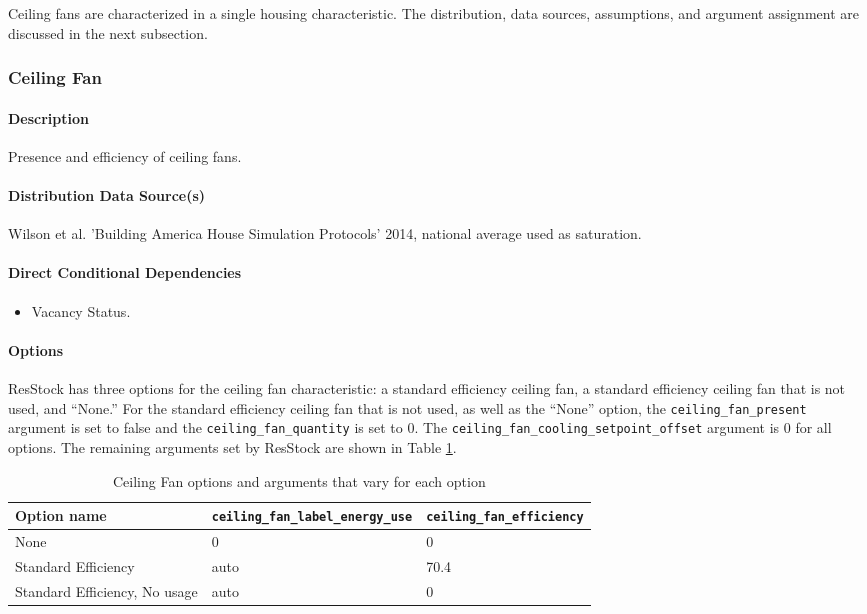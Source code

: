 Ceiling fans are characterized in a single housing characteristic. The distribution, data sources, assumptions, and argument assignment are discussed in the next subsection.

\subsubsection{Ceiling Fan}
\paragraph{Description}
Presence and efficiency of ceiling fans.

\paragraph{Distribution Data Source(s)}
Wilson et al. 'Building America House Simulation Protocols' 2014, national average used as saturation.

\paragraph{Direct Conditional Dependencies}
\begin{itemize}
    \item Vacancy Status.
\end{itemize}

\paragraph{Options}
ResStock has three options for the ceiling fan characteristic: a standard efficiency ceiling fan, a standard efficiency ceiling fan that is not used, and ``None.'' For the standard efficiency ceiling fan that is not used, as well as the ``None'' option, the \texttt{ceiling\_fan\_present} argument is set to false and the \texttt{ceiling\_fan\_quantity} is set to 0. The \texttt{ceiling\_fan\_cooling\_setpoint\_offset} argument is 0 for all options. The remaining arguments set by ResStock are shown in Table \ref{table:opt_def_ceiling_fans}.

\begin{longtable}[]{ |p{5cm}|p{4cm}|p{4cm}| }
\caption{Ceiling Fan options and arguments that vary for each option} \label{table:opt_def_ceiling_fans}\\
\toprule\noalign{}
Option name &
\texttt{ceiling\_fan\_label\_energy\_use} &
\texttt{ceiling\_fan\_efficiency} \\
\midrule\noalign{}
\endhead
\bottomrule\noalign{}
\endlastfoot
None & 0 & 0 \\
Standard Efficiency & auto & 70.4 \\
Standard Efficiency, No usage & auto & 0 \\
\end{longtable}

